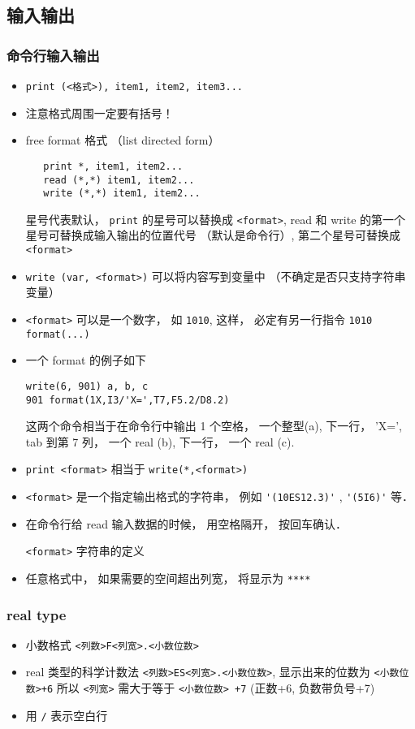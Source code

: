 \subsection{输入输出}

\subsubsection{命令行输入输出}
\begin{itemize}
\item \verb`print (<格式>), item1, item2, item3...`
\item 注意格式周围一定要有括号！
\item free format 格式 （list directed form）
\begin{lstlisting}
   print *, item1, item2...
   read (*,*) item1, item2... 
   write (*,*) item1, item2...
\end{lstlisting}
   星号代表默认， \verb|print| 的星号可以替换成 \verb`<format>`, read 和 write 的第一个星号可替换成输入输出的位置代号 （默认是命令行）, 第二个星号可替换成 \verb`<format>`
\item \verb`write (var, <format>)` 可以将内容写到变量中 （不确定是否只支持字符串变量）
\item \verb`<format>` 可以是一个数字， 如 \verb|1010|, 这样， 必定有另一行指令 \verb|1010 format(...)|
\item 一个 format 的例子如下
\begin{lstlisting}
write(6, 901) a, b, c
901 format(1X,I3/'X=',T7,F5.2/D8.2)
\end{lstlisting}
这两个命令相当于在命令行中输出 1 个空格， 一个整型(a), 下一行， 'X=', tab 到第 7 列， 一个 real (b), 下一行， 一个 real (c).
\item \verb`print <format>` 相当于 \verb`write(*,<format>)`
\item \verb`<format>` 是一个指定输出格式的字符串， 例如 \verb|'(10ES12.3)'| , \verb|'(5I6)'| 等．
\item 在命令行给 read 输入数据的时候， 用空格隔开， 按回车确认．

\verb`<format>` 字符串的定义
\item 任意格式中， 如果需要的空间超出列宽， 将显示为 \verb`****`
\end{itemize}

\subsubsection{real type}
\begin{itemize}
\item 小数格式 \verb|<列数>F<列宽>.<小数位数>|
\item real 类型的科学计数法  \verb|<列数>ES<列宽>.<小数位数>|, 显示出来的位数为 \verb|<小数位数>+6|
  所以 \verb|<列宽>| 需大于等于 \verb|<小数位数> +7| (正数+6, 负数带负号+7)
\item 用 \verb|/| 表示空白行
\end{itemize}

